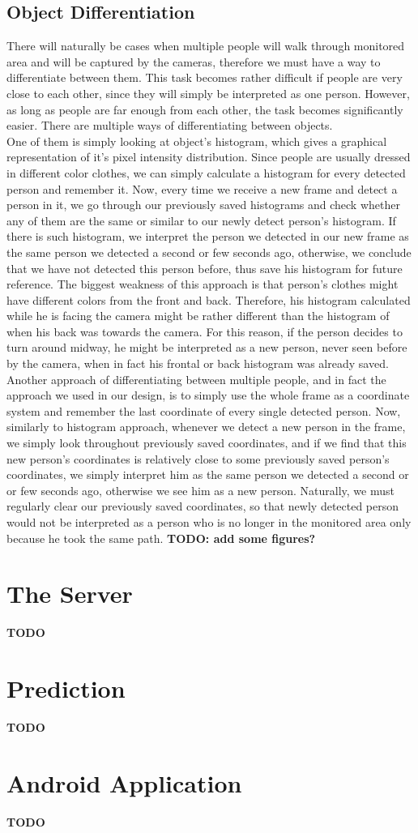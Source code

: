 	\subsection{Object Differentiation}
	There will naturally be cases when multiple people will walk through monitored area and will be captured by the cameras, therefore we must have a way to differentiate between them. This task becomes rather difficult if people are very close to each other, since they will simply be interpreted as one person. However, as long as people are far enough from each other, the task becomes significantly easier. There are multiple ways of differentiating between objects. \\One of them is simply looking at object's histogram, which gives a graphical representation of it's pixel intensity distribution. Since people are usually dressed in different color clothes, we can simply calculate a histogram for every detected person and remember it. Now, every time we receive a new frame and detect a person in it, we go through our previously saved histograms and check whether any of them are the same or similar to our newly detect person's histogram. If there is such histogram, we interpret the person we detected in our new frame as the same person we detected a second or few seconds ago, otherwise, we conclude that we have not detected this person before, thus save his histogram for future reference. The biggest weakness of this approach is that person's clothes might have different colors from the front and back. Therefore, his histogram calculated while he is facing the camera might be rather different than the histogram of when his back was towards the camera. For this reason, if the person decides to turn around midway, he might be interpreted as a new person, never seen before by the camera, when in fact his frontal or back histogram was already saved. \\Another approach of differentiating between multiple people, and in fact the approach we used in our design, is to simply use the whole frame as a coordinate system and remember the last coordinate of every single detected person. Now, similarly to histogram approach, whenever we detect a new person in the frame, we simply look throughout previously saved coordinates, and if we find that this new person's coordinates is relatively close to some previously saved person's coordinates, we simply interpret him as the same person we detected a second or or few seconds ago, otherwise we see him as a new person. Naturally, we must regularly clear our previously saved coordinates, so that newly detected person would not be interpreted as a person who is no longer in the monitored area only because he took the same path. {\color[rgb]{1,0,0} \textbf{\large TODO: add some figures?}}

\section{The Server}
{\color[rgb]{1,0,0} \textbf{\large TODO}}

\section{Prediction}
{\color[rgb]{1,0,0} \textbf{\large TODO}}

\section{Android Application}
{\color[rgb]{1,0,0} \textbf{\large TODO}}